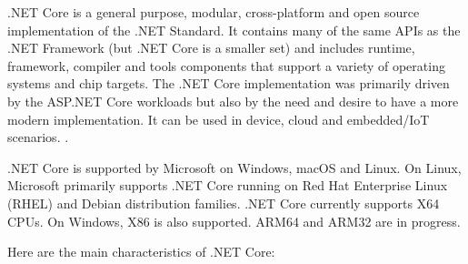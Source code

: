 \documentclass[../thesis.tex]{subfiles}
\begin{document}
.NET Core is a general purpose, modular, cross-platform and open source implementation of the .NET Standard. It contains many of the same APIs as the .NET Framework (but .NET Core is a smaller set) and includes runtime, framework, compiler and tools components that support a variety of operating systems and chip targets. The .NET Core implementation was primarily driven by the ASP.NET Core workloads but also by the need and desire to have a more modern implementation. It can be used in device, cloud and embedded/IoT scenarios. \cite{dotnet}.
\newline
    
.NET Core is supported by Microsoft on Windows, macOS and Linux. On Linux, Microsoft primarily supports .NET Core running on Red Hat Enterprise Linux (RHEL) and Debian distribution families. .NET Core currently supports X64 CPUs. On Windows, X86 is also supported. ARM64 and ARM32 are in progress.
\newline
    
Here are the main characteristics of .NET Core:
\newline
    
\end{document}
